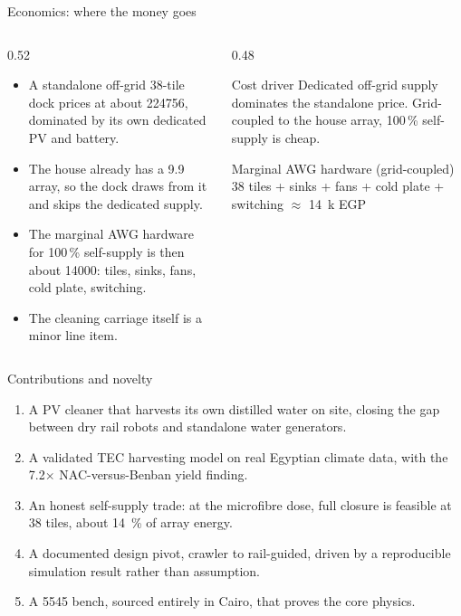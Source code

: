 \documentclass[aspectratio=169,10pt]{beamer}
\begin{document}
\begin{frame}{Economics: where the money goes}
  \begin{columns}[T]
    \begin{column}{0.52\textwidth}
      \begin{itemize}\setlength\itemsep{0.4em}
        \item A standalone off-grid 38-tile dock prices at about \SI{224756}{\EGP}, dominated by its own dedicated PV and battery.
        \item The house already has a \SI{9.9}{\kWp} array, so the dock draws from it and skips the dedicated supply.
        \item The marginal AWG hardware for 100\,\% self-supply is then about \SI{14000}{\EGP}: tiles, sinks, fans, cold plate, switching.
        \item The cleaning carriage itself is a minor line item.
      \end{itemize}
    \end{column}
    \begin{column}{0.48\textwidth}
      \begin{block}{Cost driver}
        Dedicated off-grid supply dominates the standalone price. Grid-coupled to the house array, 100\,\% self-supply is cheap.
      \end{block}
      \begin{block}{Marginal AWG hardware (grid-coupled)}
        \centering\small
        38 tiles + sinks + fans + cold plate + switching $\approx$ \SI{14}{k} EGP
      \end{block}
    \end{column}
  \end{columns}
\end{frame}

\begin{frame}{Contributions and novelty}
  \begin{enumerate}\setlength\itemsep{0.5em}
    \item A PV cleaner that harvests its own distilled water on site, closing the gap between dry rail robots and standalone water generators.
    \item A validated TEC harvesting model on real Egyptian climate data, with the 7.2$\times$ NAC-versus-Benban yield finding.
    \item An honest self-supply trade: at the microfibre dose, full closure is feasible at 38 tiles, about \SI{14}{\percent} of array energy.
    \item A documented design pivot, crawler to rail-guided, driven by a reproducible simulation result rather than assumption.
    \item A \SI{5545}{\EGP} bench, sourced entirely in Cairo, that proves the core physics.
  \end{enumerate}
\end{frame}
\end{document}
